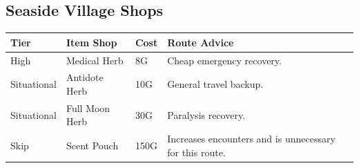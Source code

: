 \documentclass[
  american,
  10pt,
  letterpaper,
  oneside,
  open=any]{scrreprt}
\newcounter{none} %
\newenvironment{guidetable}{%
  \small\setstretch{1.0}%
  \setlength{\tabcolsep}{4pt}%
  \setlength{\LTpre}{8pt}\setlength{\LTpost}{10pt}%
  \renewcommand{\arraystretch}{1.16}%
}{ }
\begin{document}
\subsection{Seaside Village Shops}\label{seaside-village-shops}

\begin{guidetable}

{\def\LTcaptype{none} %
\begin{longtable}[]{@{}
  >{\raggedright\arraybackslash}p{}
  >{\raggedright\arraybackslash}p{}
  >{\raggedleft\arraybackslash}p{}
  >{\raggedright\arraybackslash}p{}@{}}
\toprule\noalign{}
\begin{minipage}[b]{\linewidth}\raggedright
\color{GuideGreen}\bfseries Tier
\end{minipage} & \begin{minipage}[b]{\linewidth}\raggedright
\color{GuideGreen}\bfseries Item Shop
\end{minipage} & \begin{minipage}[b]{\linewidth}\raggedleft
\color{GuideGreen}\bfseries Cost
\end{minipage} & \begin{minipage}[b]{\linewidth}\raggedright
\color{GuideGreen}\bfseries Route Advice
\end{minipage} \\
\midrule\noalign{}
\endhead
\bottomrule\noalign{}
\endlastfoot
High & Medical Herb & 8G & Cheap emergency recovery. \\
Situational & Antidote Herb & 10G & General travel backup. \\
Situational & Full Moon Herb & 30G & Paralysis recovery. \\
Skip & Scent Pouch & 150G & Increases encounters and is unnecessary for
this route. \\
\end{longtable}
}

\end{guidetable}
\end{document}
